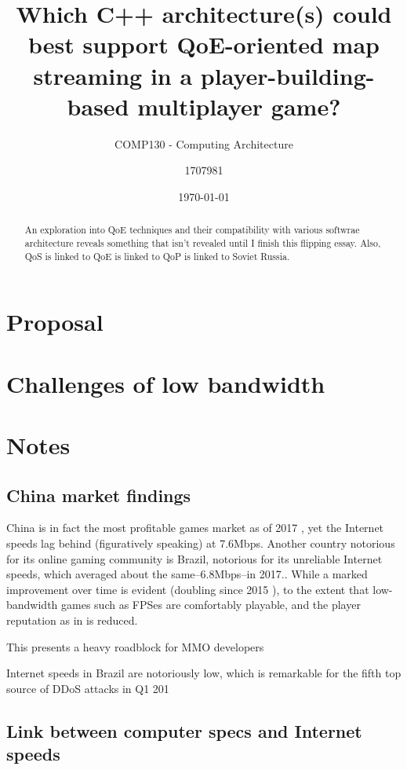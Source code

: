 \documentclass{scrartcl}
\title{Which C++ architecture(s) could best support QoE-oriented map streaming in a player-building-based multiplayer game?}
\subtitle{COMP130 - Computing Architecture}
\date{\today}
\author{1707981}
\begin{document}
\maketitle
{}

\begin{abstract}
An exploration into QoE techniques and their compatibility with various softwrae architecture reveals something that isn't revealed until I finish this flipping essay. Also, QoS is linked to QoE is linked to QoP is linked to Soviet Russia.
\end{abstract}

\section{Proposal}

\section{Challenges of low bandwidth}

\section{Notes}
\subsection{China market findings}
China is in fact the most profitable games market as of 2017 \cite{https://technology.ihs.com/593405/china-largest-games-market-continues-its-growth-story}, yet the Internet speeds lag behind (figuratively speaking) at 7.6Mbps. Another country notorious for its online gaming community is Brazil, notorious for its unreliable Internet speeds, which averaged about the same--6.8Mbps--in 2017.\cite{https://www.akamai.com/us/en/multimedia/documents/state-of-the-internet/q1-2017-state-of-the-internet-connectivity-report.pdf}. While a marked improvement over time is evident (doubling since 2015 \cite{https://www.akamai.com/us/en/multimedia/documents/state-of-the-internet/akamai-state-of-the-internet-report-q1-2015.pdf}), to the extent that low-bandwidth games such as FPSes are comfortably playable, and the player reputation as in \cite{} is reduced.

This presents a heavy roadblock for MMO developers

Internet speeds in Brazil are notoriously low, which is remarkable for the fifth top source of DDoS attacks in Q1 201\cite{https://www.akamai.com/us/en/multimedia/documents/state-of-the-internet/q4-2017-state-of-the-internet-security-report.pdf}


\subsection{Link between computer specs and Internet speeds}

\nocite{*}
 

\end{document}
